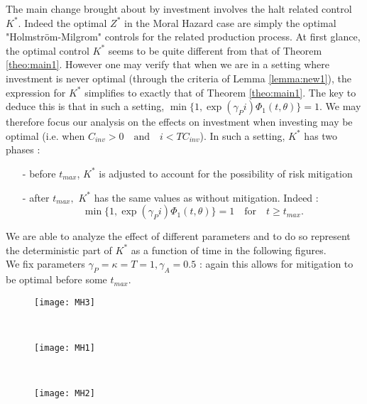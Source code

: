 \documentclass[numbook, envcountsect, envcountsame, envcountreset, runningheads, smallextended]{article}
\begin{document}
The main change brought about by investment involves the halt related control $K^*$. Indeed the optimal  $Z^*$ in the Moral Hazard case are simply the optimal "Holmström-Milgrom" controls for the related production process.  At first glance, the optimal control $K^*$ seems to be quite different from that of Theorem \ref{theo:main1}. However one may verify that when we are in a setting where investment is never optimal (through the criteria of Lemma \ref{lemma:new1}), the expression for $K^*$ simplifies to exactly that of Theorem \ref{theo:main1}. The key to deduce this is that in such a setting, $\min \Big\{1, \exp(\gamma_Pi) \Phi_1(t, \theta)\Big\}=1$. We may therefore focus our analysis on the effects on investment when investing may be optimal (i.e. when $ C_{inv} > 0 \quad \text{and} \quad i < T C_{inv}$).  In such a setting, $K^*$ has two phases : 
\begin{itemize}
\item[-] before $t_{max}$, $K^*$ is adjusted to account for the possibility of risk mitigation
\item[-] after $t_{max},$ $K^*$ has the same values as without mitigation. Indeed : 
$$\min \Big\{1, \exp(\gamma_Pi) \Phi_1(t, \theta)\Big\}=1 \quad \text{for} \quad t \geq t_{max}.$$
\end{itemize}

We are able to analyze the effect of different parameters and to do so represent the deterministic part of $K^*$ as a function of time in the following figures. \\


 We fix parameters $\gamma_P = \kappa = T = 1, \gamma_A = 0.5$ : again this allows for mitigation to be optimal before some $t_{max}$. 
\begin{figure}[htb!]
\centering

\begin{minipage}{0.31\textwidth}
  \centering
  \texttt{[image: MH3]}
  \label{fig:test22}
\end{minipage}%
~
~
\begin{minipage}{0.31\textwidth}
  \centering
  \texttt{[image: MH1]}
  \label{fig:test23}
\end{minipage}%
~
~
\begin{minipage}{0.31\textwidth}
  \centering
  \texttt{[image: MH2]}
  \label{fig:test24}
\end{minipage}
\end{figure}
\end{document}
